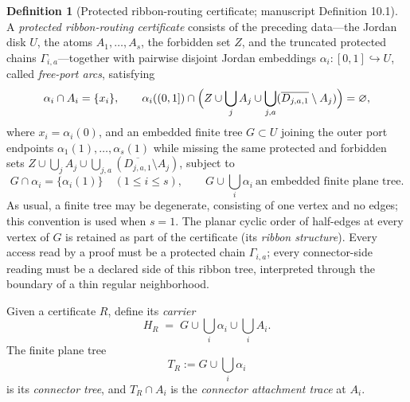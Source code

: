 \documentclass[11pt,reqno]{amsart}
\theoremstyle{definition}
\newtheorem{definition}[theorem]{Definition}
\theoremstyle{remark}
\begin{document}
\begin{definition}[Protected ribbon-routing certificate; manuscript
Definition 10.1]\label{def:certificate}
A \emph{protected ribbon-routing certificate} consists of the preceding
data---the Jordan disk $U$, the atoms $A_1,\dots,A_s$, the forbidden set
$Z$, and the truncated protected chains $\Gamma_{i,a}$---together with
pairwise disjoint Jordan embeddings
$\alpha_i\colon[0,1]\hookrightarrow U$, called \emph{free-port arcs},
satisfying
\[
\alpha_i\cap A_i=\{x_i\},\qquad
\alpha_i((0,1])\cap
\Bigl(Z\cup\bigcup_{j}A_j\cup
\bigcup_{j,a}(\overline{D_{j,a,1}}\setminus A_j)\Bigr)=\varnothing,
\]
where $x_i=\alpha_i(0)$, and an embedded finite tree $G\subset U$ joining
the outer port endpoints $\alpha_1(1),\dots,\alpha_s(1)$ while missing the
same protected and forbidden sets
$Z\cup\bigcup_jA_j\cup
\bigcup_{j,a}(\overline{D_{j,a,1}}\setminus A_j)$, subject to
\[
 G\cap\alpha_i=\{\alpha_i(1)\}\quad(1\le i\le s),
 \qquad
 G\cup\bigcup_i\alpha_i\ \text{an embedded finite plane tree}.
\]
As usual, a finite tree may be degenerate, consisting of one vertex and no
edges; this convention is used when $s=1$.
The planar cyclic order of
half-edges at every vertex of $G$ is retained as part of the certificate
(its \emph{ribbon structure}).  Every access read by a proof must be a
protected chain $\Gamma_{i,a}$; every connector-side reading must be a
declared side of this ribbon tree, interpreted through the boundary of a
thin regular neighborhood.
\end{definition}

Given a certificate $R$, define its \emph{carrier}
\begin{equation}\label{eq:C-HR}
H_R \;=\; G\cup\bigcup_i\alpha_i\cup\bigcup_iA_i .
\end{equation}
The finite plane tree
\[
T_R:=G\cup\bigcup_i\alpha_i
\]
is its \emph{connector tree}, and $T_R\cap A_i$ is the
\emph{connector attachment trace} at $A_i$.
\end{document}
